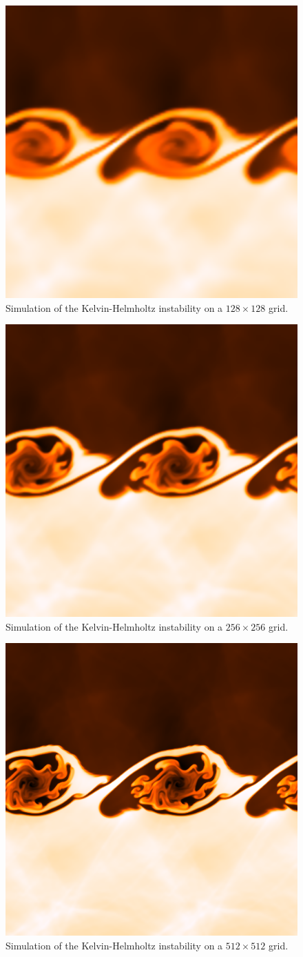 \documentclass{scrartcl}
\begin{document}
\begin{figure}[H]
	\centering
	\includegraphics[width=0.6\linewidth]{../Kelvin128_resize}
	\caption{Simulation of the Kelvin-Helmholtz instability on a \( 128 \times 128 \) grid.}
	\label{fig:kelvin128resize}
\end{figure}

\begin{figure}[H]
	\centering
	\includegraphics[width=0.6\linewidth]{../Kelvin256_resize}
	\caption{Simulation of the Kelvin-Helmholtz instability on a \( 256 \times 256 \) grid.}
	\label{fig:kelvin256resize}
\end{figure}

\begin{figure}[H]
	\centering
	\includegraphics[width=0.6\linewidth]{../Kelvin512}
	\caption{Simulation of the Kelvin-Helmholtz instability on a \( 512 \times 512 \) grid.}
	\label{fig:kelvin512}
\end{figure}
\end{document}
